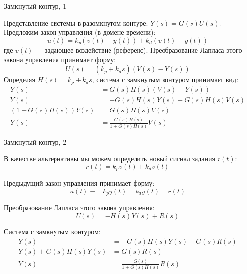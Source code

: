 \documentclass{beamer}
\begin{document}
\begin{frame}{Замкнутый контур, 1}
	\begin{flushleft}
		
		Представление системы в разомкнутом контуре: $Y(s)  = G(s) U(s)$. Предложим закон управления (в домене времени):
		\begin{equation}
			u(t) = k_p (v(t) - y(t)) + k_d (\dot v(t) - \dot y(t))
		\end{equation}
		где $v(t)$ — задающее воздействие (референс). Преобразование Лапласа этого закона управления принимает форму:
		\begin{equation}
			U(s) = (k_p + k_d s) (V(s) - Y(s))
		\end{equation}
		Определяя $H(s) = k_p + k_d s$, система с замкнутым контуром принимает вид:
		\begin{align}
			Y(s)  &= G(s) H(s) (V(s) - Y(s)) \\
			Y(s)  &= -G(s) H(s) Y(s) + G(s) H(s)V(s) \\
			(1 + G(s) H(s)) Y(s) &=  G(s) H(s)V(s) \\
			Y(s) &= \frac{G(s) H(s)}{1 + G(s) H(s)} V(s)
		\end{align}
		
		
	\end{flushleft}
\end{frame}



\begin{frame}{Замкнутый контур, 2}
	\begin{flushleft}
		
		В качестве альтернативы мы можем определить новый сигнал задания $r(t)$:
		\begin{equation}
			r(t) = k_p v(t) + k_d \dot v(t)
		\end{equation}
		
		Предыдущий закон управления принимает форму:
		\begin{equation}
			u(t) = -k_p y(t) - k_d \dot y(t) + r(t)
		\end{equation}
		
		Преобразование Лапласа этого закона управления:
		\begin{equation}
			U(s) = -H(s)Y(s) + R(s)
		\end{equation}
		
		Система с замкнутым контуром:
		\begin{align}
			Y(s)  &= -G(s) H(s)Y(s) + G(s)R(s) \\
			Y(s) + G(s) H(s)Y(s)  &=  G(s)R(s)\\
			Y(s)  &= \frac{G(s)}{1 + G(s) H(s)} R(s) 
		\end{align}
		
		
	\end{flushleft}
\end{frame}
\end{document}
